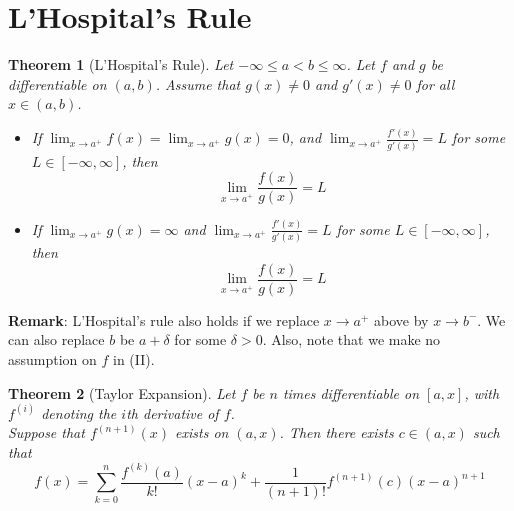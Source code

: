 \documentclass[12pt]{article}
\newtheorem{theorem}{Theorem}[section]
\theoremstyle{definition}
\begin{document}
\section{L'Hospital's Rule}
\begin{theorem}[L'Hospital's Rule]
\normalfont Let $-\infty\leq a<b\leq \infty$. Let $f$ and $g$ be differentiable on $(a,b)$. Assume that $g(x)\neq 0$ and $g'(x)\neq 0$ for all $x\in(a,b)$.\\
\begin{itemize}
	\item[(I)] If $\lim_{x\to a^{+}} f(x)=\lim_{x\to a^{+}} g(x)=0$, and $\lim_{x\to a^{+}} \frac{f'(x)}{g'(x)}=L$ for some $L\in[-\infty,\infty]$, then
	\[
\lim_{x\to a^{+}} \frac{f(x)}{g(x)}=L
	\]
	\item[(II)] If $\lim_{x\to a^{+}} g(x)=\infty$ and $\lim_{x\to a^{+}} \frac{f'(x)}{g'(x)}=L$ for some $L\in[-\infty, \infty]$, then
	\[
\lim_{x\to a^{+}} \frac{f(x)}{g(x)}=L
	\]
\end{itemize}
\end{theorem}
\textbf{Remark}: L'Hospital's rule also holds if we replace $x\to a^{+}$ above by $x\to b^{-}$. We can also replace $b$ be $a+\delta$ for some $\delta>0$. Also, note that we make no assumption on $f$ in (II).
\begin{theorem}[Taylor Expansion]
\normalfont Let $f$ be $n$ times differentiable on $[a,x]$, with $f^{(i)}$ denoting the $i$th derivative of $f$.\\
Suppose that $f^{(n+1)}(x)$ exists on $(a,x)$. Then there exists $c\in(a,x)$ such that
\[
f(x)=\sum_{k=0}^n \frac{f^{(k)}(a)}{k!}(x-a)^k +\frac{1}{(n+1)!} f^{(n+1)}(c)(x-a)^{n+1}
\]
\end{theorem}
\end{document}
